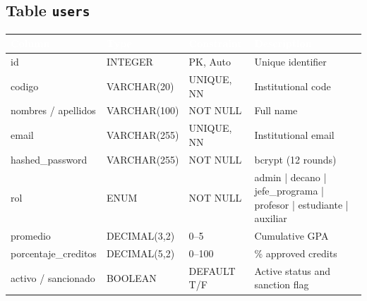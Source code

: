 \documentclass[12pt,a4paper,twoside]{report}
\begin{document}
\subsection{Table \texttt{users}}
\begin{center}
\begin{tabularx}{\textwidth}{|l|l|l|X|}
\hline
\rowcolor{tableHdr}
\textcolor{white}{\textbf{Column}} & \textcolor{white}{\textbf{Type}} &
\textcolor{white}{\textbf{Constraint}} & \textcolor{white}{\textbf{Description}} \\
\hline
\rowcolor{rowOdd}id & INTEGER & PK, Auto & Unique identifier \\
\hline\rowcolor{rowEven}codigo & VARCHAR(20) & UNIQUE, NN & Institutional code \\
\hline\rowcolor{rowOdd}nombres / apellidos & VARCHAR(100) & NOT NULL & Full name \\
\hline\rowcolor{rowEven}email & VARCHAR(255) & UNIQUE, NN & Institutional email \\
\hline\rowcolor{rowOdd}hashed\_password & VARCHAR(255) & NOT NULL & bcrypt (12 rounds) \\
\hline\rowcolor{rowEven}rol & ENUM & NOT NULL & admin | decano | jefe\_programa | profesor | estudiante | auxiliar \\
\hline\rowcolor{rowOdd}promedio & DECIMAL(3,2) & 0--5 & Cumulative GPA \\
\hline\rowcolor{rowEven}porcentaje\_creditos & DECIMAL(5,2) & 0--100 & \% approved credits \\
\hline\rowcolor{rowOdd}activo / sancionado & BOOLEAN & DEFAULT T/F & Active status and sanction flag \\
\hline
\end{tabularx}
\end{center}
\end{document}
